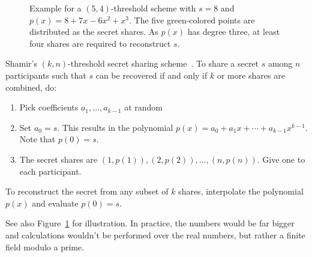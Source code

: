 \begin{figure}
    \centering
    \caption[Plot of $(5,4)$-threshold secret sharing scheme]{
        Example for a $(5, 4)$-threshold scheme with $s=8$ and $p(x) = 8 + 7x - 6x^2 + x^3$.
        The five green-colored points are distributed as the secret shares.
        As $p(x)$ has degree three, at least four shares are required to reconstruct $s$.
    }
    \label{fig:sss}
\end{figure}

\begin{definition}
    Shamir's $(k, n)$-threshold secret sharing scheme~\cite{shamir_how_1979}.
    To share a secret $s$ among $n$ participants such that $s$ can be recovered if and only if $k$ or more shares are combined, do:
    \begin{enumerate}
        \item Pick coefficients $a_1, ..., a_{k-1}$ at random 
        \item Set $a_0 = s$. This results in the polynomial $p(x) = a_0 + a_1x + \cdots + a_{k-1}x^{k-1}$. Note that $p(0) = s$.
        \item The secret shares are $(1, p(1)), (2, p(2)), \dots, (n, p(n))$. Give one to each participant.
    \end{enumerate}
    To reconstruct the secret from any subset of $k$ shares, interpolate the polynomial $p(x)$ and evaluate $p(0) = s$. 
\end{definition}

See also Figure~\ref{fig:sss} for illustration.
In practice, the numbers would be far bigger and calculations wouldn't be performed over the real numbers, but rather a finite field modulo a prime.~\cite{shamir_how_1979}

